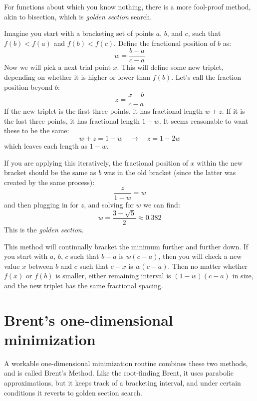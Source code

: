 For functions about which you know nothing, there is a more fool-proof
method, akin to bisection, which is {\it golden section} search.

Imagine you start with a bracketing set of points $a$, $b$, and $c$,
such that $f(b)<f(a)$ and $f(b)<f(c)$. Define the fractional position
of $b$ as:
\begin{equation}
w = \frac{b-a}{c-a}
\end{equation}
Now we will pick a next trial point $x$. This will define some new
triplet, depending on whether it is higher or lower than $f(b)$. Let's
call the fraction position beyond $b$:
\begin{equation}
z = \frac{x-b}{c-a}
\end{equation}
If the new triplet is the first three points, it has fractional length
$w+z$. If it is the last three points, it has fractional length
$1-w$. It seems reasonable to want these to be the same:
\begin{equation}
w+z = 1 - w \quad\rightarrow\quad z = 1 - 2w
\end{equation}
which leaves each length as $1-w$. 

If you are applying this iteratively, the fractional position of $x$
within the new bracket should be the same as $b$ was in the old
bracket (since the latter was created by the same process):
\begin{equation}
\frac{z}{1-w} = w
\end{equation}
and then plugging in for $z$, and solving for $w$ we can find:
\begin{equation}
w = \frac{3-\sqrt{5}}{2} \approx 0.382
\end{equation}
This is the {\it golden section}.

This method will continually bracket the minimum further and further
down. If you start with $a$, $b$, $c$ such that $b-a$ is $w(c-a)$,
then you will check a new value $x$ between $b$ and $c$ such that
$c-x$ is $w(c-a)$. Then no matter whether $f(x)$ or $f(b)$ is smaller,
either remaining interval is $(1-w)(c-a)$ in size, and the new triplet
has the same fractional spacing.

\section{Brent's one-dimensional minimization}

A workable one-dimensional minimization routine combines these two
methods, and is called Brent's Method. Like the root-finding Brent, it
uses parabolic approximations, but it keeps track of a bracketing
interval, and under certain conditions it reverts to golden section
search.

